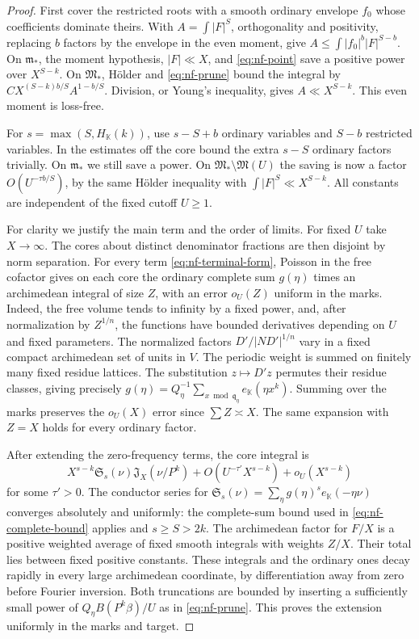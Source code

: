 \documentclass[11pt,letterpaper]{article}
\theoremstyle{definition}
\numberwithin{equation}{section}
\begin{document}
\begin{proof}
First cover the restricted roots with a smooth ordinary envelope
$f_0$ whose coefficients dominate theirs. With $A=\int|F|^S$,
orthogonality and positivity, replacing $b$ factors by the envelope
in the even moment, give
$A\le\int|f_0|^b|F|^{S-b}$. On $\mathfrak m_*$, the moment
hypothesis, $|F|\ll X$, and \eqref{eq:nf-point} save a positive
power over $X^{S-k}$. On $\mathfrak M_*$, H\"older and
\eqref{eq:nf-prune} bound the integral by
$C X^{(S-k)b/S}A^{1-b/S}$. Division, or Young's inequality, gives
$A\ll X^{S-k}$. This even moment is loss-free.

For $s=\max(S,H_{\mathbb K}(k))$, use $s-S+b$ ordinary variables
and $S-b$ restricted variables. In the estimates off the core bound
the extra $s-S$ ordinary factors trivially. On $\mathfrak m_*$
we still save a power. On
$\mathfrak M_*\setminus\mathfrak M(U)$ the saving is now a factor
$O(U^{-\tau b/S})$, by the same H\"older inequality with
$\int|F|^S\ll X^{S-k}$. All constants are independent of the fixed
cutoff $U\ge1$.

For clarity we justify the main term and the order of limits.
For fixed $U$ take $X\to\infty$. The cores about distinct
denominator fractions are then disjoint by norm separation. For every
term \eqref{eq:nf-terminal-form}, Poisson in the free cofactor gives
on each core the ordinary complete sum $g(\eta)$ times an
archimedean integral of size $Z$, with an error $o_U(Z)$ uniform in
the marks. Indeed, the free volume tends to infinity by a fixed
power, and, after normalization by $Z^{1/n}$, the functions have
bounded derivatives depending on $U$ and fixed parameters. The
normalized factors $D'/|ND'|^{1/n}$ vary in a fixed compact
archimedean set of units in $V$. The periodic weight is summed on
finitely many fixed residue lattices. The substitution
$z\mapsto D'z$ permutes their residue classes, giving precisely
$g(\eta)=Q_\eta^{-1}\sum_{x\bmod\mathfrak q_\eta}
e_{\mathbb K}(\eta x^k)$. Summing over the marks preserves the
$o_U(X)$ error since $\sum Z\asymp X$.
The same expansion with $Z=X$ holds for every ordinary factor.

After extending the zero-frequency terms, the core integral is
\[
 X^{s-k}\mathfrak S_s(\nu)\mathfrak J_X(\nu/P^k)
  +O(U^{-\tau'}X^{s-k})+o_U(X^{s-k})
\]
for some $\tau'>0$. The conductor series for
$\mathfrak S_s(\nu)=\sum_\eta g(\eta)^s e_{\mathbb K}(-\eta\nu)$
converges absolutely and uniformly: the complete-sum bound used in
\eqref{eq:nf-complete-bound} applies and $s\ge S>2k$.
The archimedean factor for $F/X$ is a positive weighted average
of fixed smooth integrals with weights $Z/X$. Their total lies
between fixed positive constants. These integrals and the ordinary
ones decay rapidly in every large archimedean coordinate, by
differentiation away from zero before Fourier inversion. Both
truncations are bounded by inserting a sufficiently small power
of $Q_\eta B(P^k\beta)/U$ as in \eqref{eq:nf-prune}.
This proves the extension uniformly in the marks and target.


\end{proof}
\end{document}

